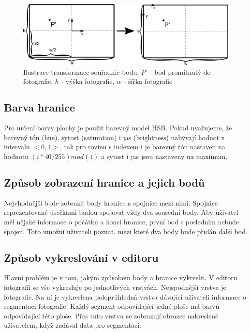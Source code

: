 \documentclass[11pt,twoside,a4paper]{book}
\begin{document}
\begin{figure}[]
	\begin{center}
		\includegraphics[width=13cm]{ilustrace/Il-7-1}
		\caption{Ilustrace transformace souřadnic bodu. $P'$ - bod promítnutý do fotografie, $h$ - výška fotografie, $w$ - šířka fotografie}
		\label{fig:7-1}
	\end{center}
\end{figure}

\subsection{Barva hranice}
Pro určení barvy plochy je použit barevný model HSB. Pokud uvažujeme, že barevný tón (hue), sytost (saturation) i jas (brightness) nabývají hodnot z intervalu $<0,1>$, tak pro rovinu s indexem i je barevný tón nastaven na hodnotu $(i*40/255) mod (1)$ a sytost i jas jsou nastaveny na maximum. 

\subsection{Způsob zobrazení hranice a jejich bodů}
Nejvhodnější bude zobrazit body hranice a spojnice mezi nimi. Spojnice reprezentované úsečkami budou spojovat vždy dva sousední body. Aby uživatel měl nějaké informace o počátku a konci hranice, první bod s posledním nebude spojen. Toto umožní uživateli poznat, mezi které dva body bude přidán další bod.

\subsection{Způsob vykreslování v editoru}
\label{vykresleni}
Hlavní problém je v tom, jakým způsobem body a hranice vykreslit. V editoru fotografií se vše vykresluje po jednotlivých vrstvách. Nejspodnější vrstva je fotografie. Na ní je vykreslena poloprůhledná vrstva dávající uživateli informace o segmentaci fotografie. Každý segment odpovídající jedné ploše má barvu odpovídající této ploše. Přes tuto vrstvu se zobrazují obrazce nakreslené uživatelem, když zadával data pro segmentaci.
\end{document}
